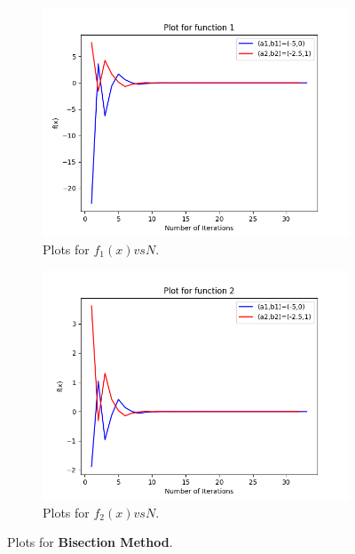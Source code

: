 \documentclass[a4paper, 12pt]{report}
\begin{document}
\begin{figure}[!h]
\centering
\begin{subfigure}{.55\textwidth}
  \centering
  \includegraphics[width=.95\linewidth]{BM1.png}
  \caption{Plots for $f_{1}(x) vs N$.}
\end{subfigure}%
\begin{subfigure}{.55\textwidth}
  \centering
  \includegraphics[width=.95\linewidth]{BM2.png}
  \caption{Plots for $f_{2}(x) vs N$.}
\end{subfigure}
\caption{Plots for \textbf{Bisection Method}.}
\label{fig:Plot1}
\end{figure}
\end{document}
